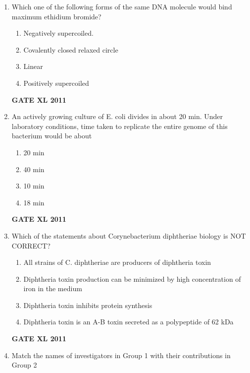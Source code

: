 \documentclass[journal,12pt,onecolumn]{IEEEtran}
\begin{document}
\begin{enumerate}
{The order of the markers in the original F" strain is}
		\begin{enumerate}
			\item DQWMTPXACNB
			\item AXPTMDQWBNC
			\item BNCAXPTMDOW
			\item BDQWMNCAXPT
		\end{enumerate}
		\hfill{\textbf{GATE XL 2011}}
\item {Which one of the following forms of the same DNA molecule would bind maximum ethidium bromide?}
		\begin{enumerate}
			\item Negatively supercoiled.
			\item Covalently closed relaxed circle
			\item Linear
			\item Positively supercoiled
		\end{enumerate}
		\hfill{\textbf{GATE XL 2011}}
\item {An actively growing culture of E. coli divides in about 20 min. Under laboratory conditions, time taken to replicate the entire genome of this bacterium would be about}
		\begin{enumerate}
			\item 20 min
			\item 40 min
			\item 10 min
			\item 18 min
		\end{enumerate}
		\hfill{\textbf{GATE XL 2011}}
\item {Which of the statements about Corynebacterium diphtheriae biology is NOT CORRECT?}
		\begin{enumerate}
			\item All strains of C. diphtheriae are producers of diphtheria toxin
			\item Diphtheria toxin production can be minimized by high concentration of iron in the medium
			\item Diphtheria toxin inhibits protein synthesis
			\item Diphtheria toxin is an A-B toxin secreted as a polypeptide of 62 kDa
		\end{enumerate}
		\hfill{\textbf{GATE XL 2011}}
\item {Match the names of investigators in Group 1 with their contributions in Group 2}


	\begin{minipage}{0.5\textwidth}
	\begin{flushleft}



\end{flushleft}
\end{minipage}
\end{enumerate}
\end{document}
